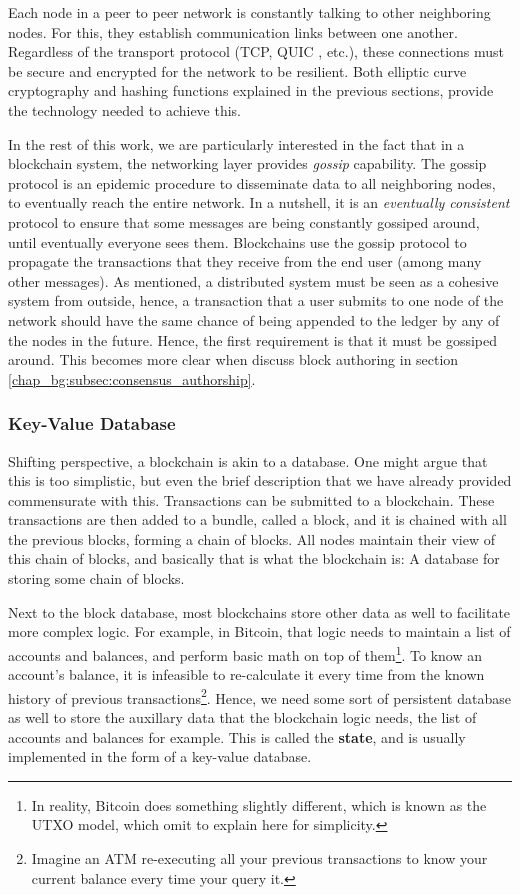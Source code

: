 Each node in a peer to peer network is constantly talking to other neighboring nodes. For this, they
establish communication links between one another. Regardless of the transport protocol (TCP, QUIC
\cite{carlucciHTTPUDPExperimental2015}, etc.), these connections must be secure and encrypted for
the network to be resilient. Both elliptic curve cryptography and hashing functions explained in the
previous sections, provide the technology needed to achieve this.

In the rest of this work, we are particularly interested in the fact that in a blockchain system,
the networking layer provides \textit{gossip} capability. The gossip protocol is an epidemic
procedure to disseminate data to all neighboring nodes, to eventually reach the entire network. In a
nutshell, it is an \textit{eventually consistent} protocol to ensure that some messages are being
constantly gossiped around, until eventually everyone sees them. Blockchains use the gossip protocol
to propagate the transactions that they receive from the end user (among many other messages). As
mentioned, a distributed system must be seen as a cohesive system from outside, hence, a transaction
that a user submits to one node of the network should have the same chance of being appended to the
ledger by any of the nodes in the future. Hence, the first requirement is that it must be gossiped
around. This becomes more clear when discuss block authoring in section
\ref{chap_bg:subsec:consensus_authorship}.

\subsubsection{Key-Value Database} \label{chap_bg:subsec:kvdb}

Shifting perspective, a blockchain is akin to a database. One might argue that this is too
simplistic, but even the brief description that we have already provided commensurate with this.
Transactions can be submitted to a blockchain. These transactions are then added to a bundle, called
a block, and it is chained with all the previous blocks, forming a chain of blocks. All nodes
maintain their view of this chain of blocks, and basically that is what the blockchain is: A
database for storing some chain of blocks.

Next to the block database, most blockchains store other data as well to facilitate more complex
logic. For example, in Bitcoin, that logic needs to maintain a list of accounts and balances, and
perform basic math on top of them\footnote{In reality, Bitcoin does something slightly different,
which is known as the UTXO model, which omit to explain here for simplicity.}. To know an account's
balance, it is infeasible to re-calculate it every time from the known history of previous
transactions\footnote{Imagine an ATM re-executing all your previous transactions to know your
current balance every time your query it.}. Hence, we need some sort of persistent database as well
to store the auxillary data that the blockchain logic needs, the list of accounts and balances for
example. This is called the \textbf{state}, and is usually implemented in the form of a key-value
database.

